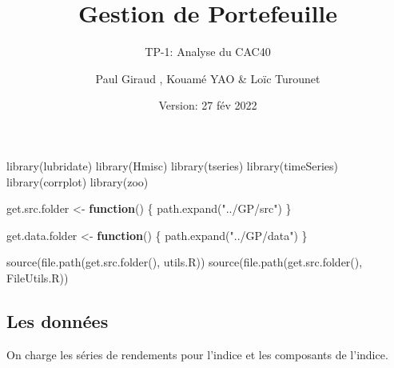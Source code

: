 \documentclass[
]{article}
\title{Gestion de Portefeuille}
\subtitle{TP-1: Analyse du CAC40}
\author{Paul Giraud , Kouamé YAO \& Loïc Turounet}
\date{Version: 27 fév 2022}
\newenvironment{Shaded}{\begin{snugshade}}{\end{snugshade}}
\newcommand{\ControlFlowTok}[1]{\textcolor[rgb]{0.13,0.29,0.53}{\textbf{#1}}}
\newcommand{\FunctionTok}[1]{\textcolor[rgb]{0.00,0.00,0.00}{#1}}
\newcommand{\NormalTok}[1]{#1}
\newcommand{\OtherTok}[1]{\textcolor[rgb]{0.56,0.35,0.01}{#1}}
\newcommand{\StringTok}[1]{\textcolor[rgb]{0.31,0.60,0.02}{#1}}
\begin{document}
\maketitle

\begin{Shaded}
\begin{Highlighting}[]
\FunctionTok{library}\NormalTok{(lubridate)}
\FunctionTok{library}\NormalTok{(Hmisc)}
\FunctionTok{library}\NormalTok{(tseries)}
\FunctionTok{library}\NormalTok{(timeSeries)}
\FunctionTok{library}\NormalTok{(corrplot)}
\FunctionTok{library}\NormalTok{(zoo)}

\NormalTok{get.src.folder }\OtherTok{\textless{}{-}} \ControlFlowTok{function}\NormalTok{() \{}
  \FunctionTok{path.expand}\NormalTok{(}\StringTok{"../GP/src"}\NormalTok{)}
\NormalTok{\}}

\NormalTok{get.data.folder }\OtherTok{\textless{}{-}} \ControlFlowTok{function}\NormalTok{() \{}
  \FunctionTok{path.expand}\NormalTok{(}\StringTok{"../GP/data"}\NormalTok{)}
\NormalTok{\}}

\FunctionTok{source}\NormalTok{(}\FunctionTok{file.path}\NormalTok{(}\FunctionTok{get.src.folder}\NormalTok{(), }\StringTok{\textquotesingle{}utils.R\textquotesingle{}}\NormalTok{))}
\FunctionTok{source}\NormalTok{(}\FunctionTok{file.path}\NormalTok{(}\FunctionTok{get.src.folder}\NormalTok{(), }\StringTok{\textquotesingle{}FileUtils.R\textquotesingle{}}\NormalTok{))}
\end{Highlighting}
\end{Shaded}

\hypertarget{les-donnuxe9es}{%
\subsection{Les données}\label{les-donnuxe9es}}

On charge les séries de rendements pour l'indice et les composants de
l'indice.
\end{document}
